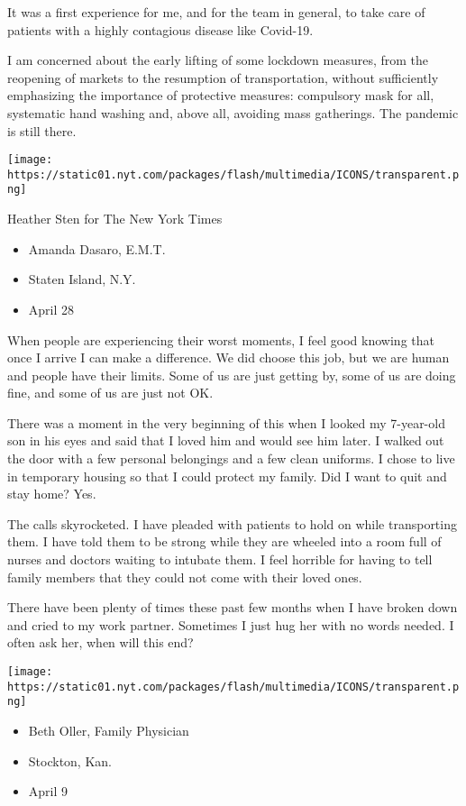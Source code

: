 It was a first experience for me, and for the team in general, to take
care of patients with a highly contagious disease like Covid-19.

I am concerned about the early lifting of some lockdown measures, from
the reopening of markets to the resumption of transportation, without
sufficiently emphasizing the importance of protective measures:
compulsory mask for all, systematic hand washing and, above all,
avoiding mass gatherings. The pandemic is still there.

\texttt{[image: https://static01.nyt.com/packages/flash/multimedia/ICONS/transparent.png]}

Heather Sten for The New York Times

\begin{itemize}
\tightlist
\item
  Amanda Dasaro, E.M.T.
\item
  Staten Island, N.Y.
\item
  April 28
\end{itemize}

When people are experiencing their worst moments, I feel good knowing
that once I arrive I can make a difference. We did choose this job, but
we are human and people have their limits. Some of us are just getting
by, some of us are doing fine, and some of us are just not OK.

There was a moment in the very beginning of this when I looked my
7-year-old son in his eyes and said that I loved him and would see him
later. I walked out the door with a few personal belongings and a few
clean uniforms. I chose to live in temporary housing so that I could
protect my family. Did I want to quit and stay home? Yes.

The calls skyrocketed. I have pleaded with patients to hold on while
transporting them. I have told them to be strong while they are wheeled
into a room full of nurses and doctors waiting to intubate them. I feel
horrible for having to tell family members that they could not come with
their loved ones.

There have been plenty of times these past few months when I have broken
down and cried to my work partner. Sometimes I just hug her with no
words needed. I often ask her, when will this end?

\texttt{[image: https://static01.nyt.com/packages/flash/multimedia/ICONS/transparent.png]}

\begin{itemize}
\tightlist
\item
  Beth Oller, Family Physician
\item
  Stockton, Kan.
\item
  April 9
\end{itemize}

